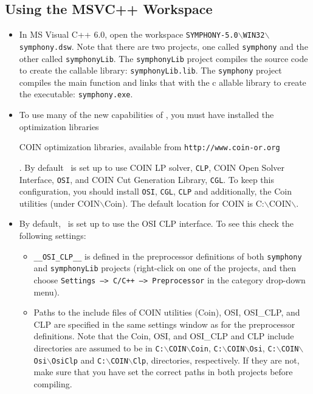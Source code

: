 \subsection{Using the MSVC++ Workspace}

\begin{itemize}

\item In MS Visual C++ 6.0, open the workspace
\texttt{SYMPHONY-5.0$\backslash$WIN32$\backslash$symphony.dsw}. 
Note that there are two projects, one called \texttt{symphony} and the other 
called
\texttt{symphonyLib}. The \texttt{symphonyLib} project compiles the source 
code to create the callable library: \texttt{symphonyLib.lib}. The 
\texttt{symphony} project compiles the main  function and links that with the c
allable library to create the executable: \texttt{symphony.exe}. 

\item To use many of the new capabilities of \BB, you must have installed
the  optimization
libraries 
\begin{latexonly} 
COIN optimization libraries, available from
\texttt{http://www.coin-or.org} 
\end{latexonly}. By default \BB\ is 
set up to use COIN LP solver, \texttt{CLP}, COIN Open Solver Interface, 
\texttt{OSI}, and COIN Cut Generation Library, \texttt{CGL}. To keep this 
configuration, you should install \texttt{OSI}, \texttt{CGL}, \texttt{CLP} 
and additionally, the Coin utilities (under COIN$\backslash$Coin).
The default location for COIN is C:$\backslash$COIN$\backslash$.

\item By default, \BB\ is set up to use the OSI CLP interface. To see this
check the following settings:

\begin{itemize}

\item \texttt{\_\_OSI\_CLP\_\_} is defined in the preprocessor
definitions of both \texttt{symphony} and \texttt{symphonyLib} projects 
(right-click on one of the projects, and then choose \texttt{Settings --> C/C++
--> Preprocessor} in the category drop-down menu).

\item Paths to the include files of COIN utilities (Coin), OSI, OSI\_CLP, and
CLP are specified in the same settings window as for the preprocessor
definitions. Note that the Coin, OSI, and OSI\_CLP and CLP include 
directories are assumed to be in \texttt{C:$\backslash$COIN$\backslash$Coin},
\texttt{C:$\backslash$COIN$\backslash$Osi},
\texttt{C:$\backslash$COIN$\backslash$Osi$\backslash$OsiClp} and 
\texttt{C:$\backslash$COIN$\backslash$Clp},
directories, respectively. If they are not, make sure that you have set the
correct paths in both projects before compiling.


\end{itemize}
\end{itemize}
